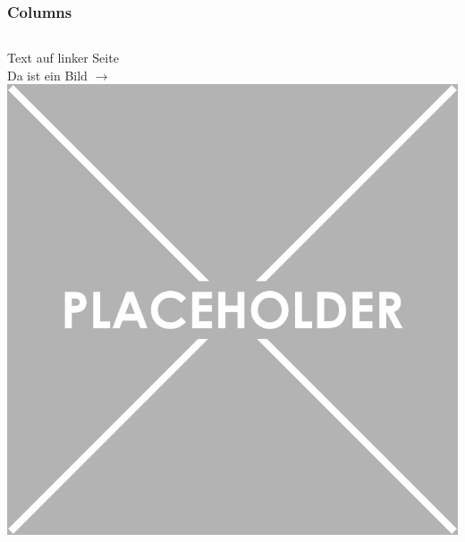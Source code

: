 \documentclass[xcolor=dvipsnames]{beamer}
\begin{document}
\begin{frame}\frametitle{Columns}
	\begin{columns}[t,onlytextwidth]
		Text auf linker Seite\\
		Da ist ein Bild $\rightarrow$
		\centering
		\includegraphics[width=1.0\textwidth,valign=t]{pictures/placeholder}
	\end{columns}
\end{frame}
\end{document}
